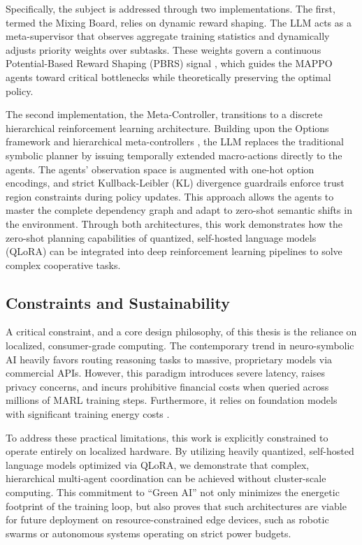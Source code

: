 Specifically, the subject is addressed through two implementations. The first, termed the Mixing Board, relies on dynamic reward shaping. The LLM acts as a meta-supervisor that observes aggregate training statistics and dynamically adjusts priority weights over subtasks. These weights govern a continuous Potential-Based Reward Shaping (PBRS) signal \parencite{Ng_Harada_Russell_1999}, which guides the MAPPO agents toward critical bottlenecks while theoretically preserving the optimal policy.

The second implementation, the Meta-Controller, transitions to a discrete hierarchical reinforcement learning architecture. Building upon the Options framework \parencite{Sutton_Precup_Singh_1999} and hierarchical meta-controllers \parencite{Kulkarni_Narasimhan_Saeedi_Tenenbaum_2016}, the LLM replaces the traditional symbolic planner by issuing temporally extended macro-actions directly to the agents. The agents' observation space is augmented with one-hot option encodings, and strict Kullback-Leibler (KL) divergence guardrails enforce trust region constraints during policy updates. This approach allows the agents to master the complete dependency graph and adapt to zero-shot semantic shifts in the environment. Through both architectures, this work demonstrates how the zero-shot planning capabilities of quantized, self-hosted language models (QLoRA) \parencite{Dettmers_Pagnoni_Holtzman_Zettlemoyer_2023} can be integrated into deep reinforcement learning pipelines to solve complex cooperative tasks.

\subsection{Constraints and Sustainability}
\label{sec:sustainability}

A critical constraint, and a core design philosophy, of this thesis is the reliance on localized, consumer-grade computing. The contemporary trend in neuro-symbolic AI heavily favors routing reasoning tasks to massive, proprietary models via commercial APIs. However, this paradigm introduces severe latency, raises privacy concerns, and incurs prohibitive financial costs when queried across millions of MARL training steps. Furthermore, it relies on foundation models with significant training energy costs \parencite{strubell2019energy}. 

To address these practical limitations, this work is explicitly constrained to operate entirely on localized hardware. By utilizing heavily quantized, self-hosted language models optimized via QLoRA, we demonstrate that complex, hierarchical multi-agent coordination can be achieved without cluster-scale computing. This commitment to ``Green AI'' \parencite{schwartz2020green} not only minimizes the energetic footprint of the training loop, but also proves that such architectures are viable for future deployment on resource-constrained edge devices, such as robotic swarms or autonomous systems operating on strict power budgets.

